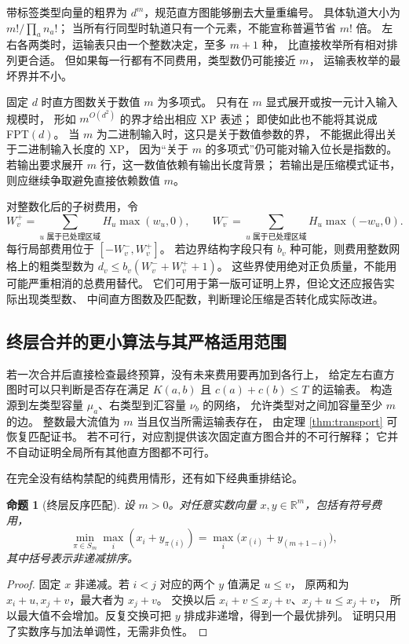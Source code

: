 \documentclass[UTF8,a4paper,11pt,fontset=fandol]{ctexart}
\newtheorem{proposition}[theorem]{命题}
\theoremstyle{definition}
\newcommand{\R}{\mathbb R}
\begin{document}
带标签类型向量的粗界为 $d^m$，规范直方图能够删去大量重编号。
具体轨道大小为 $m!/\prod_an_a!$；
当所有行同型时轨道只有一个元素，不能宣称普遍节省 $m!$ 倍。
左右各两类时，运输表只由一个整数决定，至多 $m+1$ 种，
比直接枚举所有相对排列更合适。
但如果每一行都有不同费用，类型数仍可能接近 $m$，
运输表枚举的最坏界并不小。

固定 $d$ 时直方图数关于数值 $m$ 为多项式。
只有在 $m$ 显式展开或按一元计入输入规模时，
形如 $m^{O(d^2)}$ 的界才给出相应 XP 表述；
即使如此也不能将其说成 FPT$(d)$。
当 $m$ 为二进制输入时，这只是关于数值参数的界，
不能据此得出关于二进制输入长度的 XP，
因为“关于 $m$ 的多项式”仍可能对输入位长是指数的。
若输出要求展开 $m$ 行，这一数值依赖有输出长度背景；
若输出是压缩模式证书，则应继续争取避免直接依赖数值 $m$。

对整数化后的子树费用，令
\[
W_v^+=\sum_{u\text{ 属于已处理区域}}H_u\max(w_u,0),\qquad
W_v^-=\sum_{u\text{ 属于已处理区域}}H_u\max(-w_u,0).
\]
每行局部费用位于 $[-W_v^-,W_v^+]$。
若边界结构字段只有 $b_v$ 种可能，则费用整数网格上的粗类型数为
$d_v\le b_v(W_v^-+W_v^++1)$。
这些界使用绝对正负质量，不能用可能严重相消的总费用替代。
它们可用于第一版可证明上界，但论文还应报告实际出现类型数、
中间直方图数及匹配数，判断理论压缩是否转化成实际改进。

\subsection{终层合并的更小算法与其严格适用范围}

若一次合并后直接检查最终预算，没有未来费用要再加到各行上，
给定左右直方图时可以只判断是否存在满足
$K(a,b)$ 且 $c(a)+c(b)\le T$ 的运输表。
构造源到左类型容量 $\mu_a$、右类型到汇容量 $\nu_b$ 的网络，
允许类型对之间加容量至少 $m$ 的边。
整数最大流值为 $m$ 当且仅当所需运输表存在，
由定理 \ref{thm:transport} 可恢复匹配证书。
若不可行，对应割提供该次固定直方图合并的不可行解释；
它并不自动证明全局所有其他直方图都不可行。

在完全没有结构禁配的纯费用情形，还有如下经典重排结论。
\begin{proposition}[终层反序匹配]\label{prop:antitone}
设 $m>0$。对任意实数向量 $x,y\in\R^m$，包括有符号费用，
\[
\min_{\pi\in S_m}\max_i(x_i+y_{\pi(i)})
=\max_i\bigl(x_{(i)}+y_{(m+1-i)}\bigr),
\]
其中括号表示非递减排序。
\end{proposition}
\begin{proof}
固定 $x$ 非递减。若 $i<j$ 对应的两个 $y$ 值满足 $u\le v$，
原两和为 $x_i+u,x_j+v$，最大者为 $x_j+v$。
交换以后 $x_i+v\le x_j+v$、$x_j+u\le x_j+v$，
所以最大值不会增加。反复交换可把 $y$ 排成非递增，得到一个最优排列。
证明只用了实数序与加法单调性，无需非负性。
\end{proof}
\end{document}
